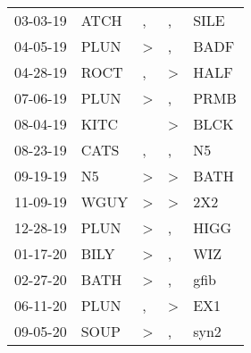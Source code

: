 \begin{supertabular}{p{0.07\textwidth}p{0.06\textwidth}p{0.02\textwidth}p{0.02\textwidth}p{0.06\textwidth}}
 03-03-19\textsuperscript{} &  ATCH\textsuperscript{} &                , &                , &           SILE\textsuperscript{} \\
 04-05-19\textsuperscript{} &  PLUN\textsuperscript{} &     \textgreater &                , &           BADF\textsuperscript{} \\
 04-28-19\textsuperscript{} &  ROCT\textsuperscript{} &                , &     \textgreater &           HALF\textsuperscript{} \\
 07-06-19\textsuperscript{} &  PLUN\textsuperscript{} &     \textgreater &                , &           PRMB\textsuperscript{} \\
 08-04-19\textsuperscript{} &  KITC\textsuperscript{} &                  &     \textgreater &           BLCK\textsuperscript{} \\
 08-23-19\textsuperscript{} &  CATS\textsuperscript{} &                , &                , &             N5\textsuperscript{} \\
 09-19-19\textsuperscript{} &    N5\textsuperscript{} &     \textgreater &     \textgreater &           BATH\textsuperscript{} \\
 11-09-19\textsuperscript{} &  WGUY\textsuperscript{} &     \textgreater &     \textgreater &            2X2\textsuperscript{} \\
 12-28-19\textsuperscript{} &  PLUN\textsuperscript{} &     \textgreater &                , &           HIGG\textsuperscript{} \\
 01-17-20\textsuperscript{} &  BILY\textsuperscript{} &     \textgreater &                , &            WIZ\textsuperscript{} \\
 02-27-20\textsuperscript{} &  BATH\textsuperscript{} &     \textgreater &                , &           gfib\textsuperscript{} \\
 06-11-20\textsuperscript{} &  PLUN\textsuperscript{} &                , &     \textgreater &            EX1\textsuperscript{} \\
 09-05-20\textsuperscript{} &  SOUP\textsuperscript{} &     \textgreater &                , &           syn2\textsuperscript{} \\
\end{supertabular}
